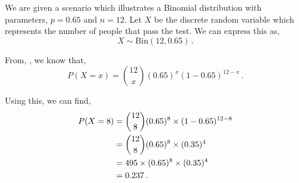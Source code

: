 %
%


\begin{subquestions}
	
\subquestion

We are given a scenario which illustrates a Binomial distribution with parameters, $p = 0.65$ and $n=12$. Let $X$ be the discrete random variable which represents the number of people that pass the test. We can express this as,
\begin{equation}
	X \sim \text{Bin}(12,0.65) \,.
\end{equation}

\begin{subsubquestions}
	
\subsubquestion

\begin{subsubsubquestions}
	
\subsubsubquestion

From, , we know that,
\begin{equation}
	P(X = x) = { 12 \choose x} (0.65)^x (1-0.65)^{12-x} \,. \label{2009:q4:BinEqn1}
\end{equation}
	
Using this, we can find,
\begin{align}
	P(X=8) & = { 12 \choose 8} (0.65)^8 \times (1-0.65)^{12-8} \nonumber \\
		   & = { 12 \choose 8} (0.65)^8 \times (0.35)^{4} \nonumber \\
		   & = 495 \times (0.65)^8 \times (0.35)^{4} \nonumber \\
		   & = 0.237 \,.
\end{align}


\subsubsubquestion


\end{subsubsubquestions}
\end{subsubquestions}
\end{subquestions}
